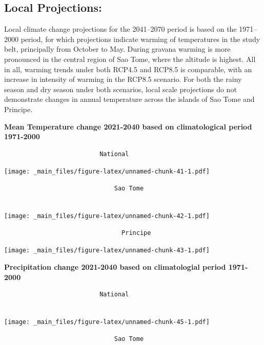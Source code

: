 \documentclass[
]{book}
\begin{document}
\hypertarget{local-projections-1}{%
\subsection{Local Projections:}\label{local-projections-1}}

Local climate change projections for the 2041--2070 period is based on the 1971--2000 period, for which projections indicate warming of temperatures in the study belt, principally from October to May. During gravana warming is more pronounced in the central region of Sao Tome, where the altitude is highest. All in all, warming trends under both RCP4.5 and RCP8.5 is comparable, with an increase in intensity of warming in the RCP8.5 scenario. For both the rainy season and dry season under both scenarios, local scale projections do not demonstrate changes in annual temperature across the islands of Sao Tome and Principe.

\textbf{Mean Temperature change 2021-2040 based on climatological period 1971-2000}

\begin{verbatim}
                          National 
\end{verbatim}

\texttt{[image: \_main\_files/figure-latex/unnamed-chunk-41-1.pdf]}

\begin{verbatim}
                              Sao Tome 
                              
\end{verbatim}

\texttt{[image: \_main\_files/figure-latex/unnamed-chunk-42-1.pdf]}

\begin{verbatim}
                                Principe
\end{verbatim}

\texttt{[image: \_main\_files/figure-latex/unnamed-chunk-43-1.pdf]}

\textbf{Precipitation change 2021-2040 based on climatologial period 1971-2000}

\begin{verbatim}
                          National
                          
\end{verbatim}

\texttt{[image: \_main\_files/figure-latex/unnamed-chunk-45-1.pdf]}

\begin{verbatim}
                              Sao Tome
\end{verbatim}
\end{document}

